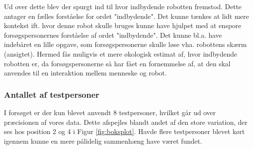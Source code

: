 Ud over dette blev der spurgt ind til hvor indbydende robotten fremstod. Dette antager en fælles forståelse for ordet "indbydende". Det kunne tænkes at lidt mere kontekst ift. hvor denne robot skulle bruges kunne have hjulpet med at enspore forsøgspersonernes forståelse af ordet "indbydende". Det kunne bl.a. have indebåret en lille opgave, som forsøgspersonerne skulle løse vha. robottens skærm (ansigtet). Hermed fås muligvis et mere økologisk estimat af, hvor indbydende robotten er, da forsøgspersonerne så har fået en fornemmelse af, at den skal anvendes til en interaktion mellem menneske og robot.


\subsubsection{Antallet af testpersoner}
I forsøget er der kun blevet anvendt 8 testpersoner, hvilket går ud over præcisionen af vores data. Dette afspejles blandt andet af den store variation, der ses hos position 2 og 4 i Figur \ref{fig:boksplot}. Havde flere testpersoner blevet kørt igennem kunne en mere pålidelig sammenhæng have været fundet.




